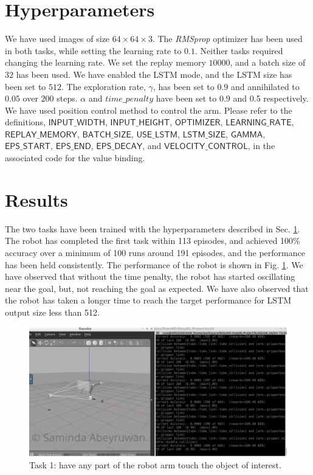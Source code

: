 \documentclass[10pt,journal,compsoc]{IEEEtran}
\begin{document}
\section{Hyperparameters}
\label{sec:hyperparameters}

We have used images of size $64 \times 64 \times 3$. The \textit{RMSprop} optimizer has been used in both tasks, while setting the learning rate to $0.1$. Neither tasks required changing the learning rate. We set the replay memory $10000$, and a batch size of $32$ has been used. We have enabled the LSTM mode, and the LSTM size has been set to $512$. The exploration rate, $\gamma$, has been set to $0.9$ and annihilated to $0.05$ over $200$ steps. $\alpha$ and $time\_penalty$  have been set to 0.9 and 0.5 respectively. We have used position control method to control the arm. Please refer to the definitions, $\mathsf{INPUT\_WIDTH}$, $\mathsf{INPUT\_HEIGHT}$, $\mathsf{OPTIMIZER}$, $\mathsf{LEARNING\_RATE}$, $\mathsf{REPLAY\_MEMORY}$, $\mathsf{BATCH\_SIZE}$, $\mathsf{USE\_LSTM}$, $\mathsf{LSTM\_SIZE}$,  $\mathsf{GAMMA}$, $\mathsf{EPS\_START}$, $\mathsf{EPS\_END}$, $\mathsf{EPS\_DECAY}$, and $\mathsf{VELOCITY\_CONTROL}$, in the associated code for the value binding.  

\section{Results}

The two tasks have been trained with the hyperparameters described in Sec. \ref{sec:hyperparameters}. The robot has completed the first task within 113 episodes, and achieved 100\% accuracy over a minimum of 100 runs around 191 episodes, and the performance has been held consistently. The performance of the robot is shown in  Fig. \ref{fig:task1}. We have observed that without the time penalty, the robot has started oscillating near the goal, but, not reaching the goal as expected. We have also observed that the robot has taken a longer time to reach the target performance for LSTM output size less than 512.  

\begin{figure}[thpb]
      \centering
      \includegraphics[width=\linewidth]{task1}
      \caption{Task 1: have any part of the robot arm touch the object of interest.}
      \label{fig:task1}
\end{figure}
\end{document}
